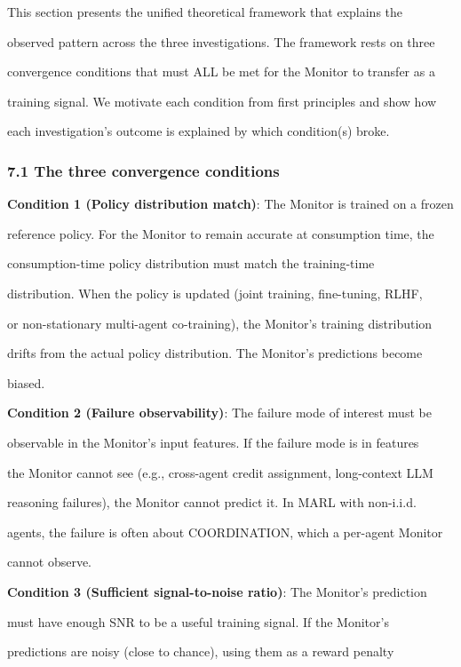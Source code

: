 \documentclass[
]{article}
\begin{document}
This section presents the unified theoretical framework that explains
the

observed pattern across the three investigations. The framework rests on
three

convergence conditions that must ALL be met for the Monitor to transfer
as a

training signal. We motivate each condition from first principles and
show how

each investigation's outcome is explained by which condition(s) broke.

\subsubsection{7.1 The three convergence
conditions}\label{the-three-convergence-conditions}

\textbf{Condition 1 (Policy distribution match)}: The Monitor is trained
on a frozen

reference policy. For the Monitor to remain accurate at consumption
time, the

consumption-time policy distribution must match the training-time

distribution. When the policy is updated (joint training, fine-tuning,
RLHF,

or non-stationary multi-agent co-training), the Monitor's training
distribution

drifts from the actual policy distribution. The Monitor's predictions
become

biased.

\textbf{Condition 2 (Failure observability)}: The failure mode of
interest must be

observable in the Monitor's input features. If the failure mode is in
features

the Monitor cannot see (e.g., cross-agent credit assignment,
long-context LLM

reasoning failures), the Monitor cannot predict it. In MARL with
non-i.i.d.

agents, the failure is often about COORDINATION, which a per-agent
Monitor

cannot observe.

\textbf{Condition 3 (Sufficient signal-to-noise ratio)}: The Monitor's
prediction

must have enough SNR to be a useful training signal. If the Monitor's

predictions are noisy (close to chance), using them as a reward penalty
\end{document}
